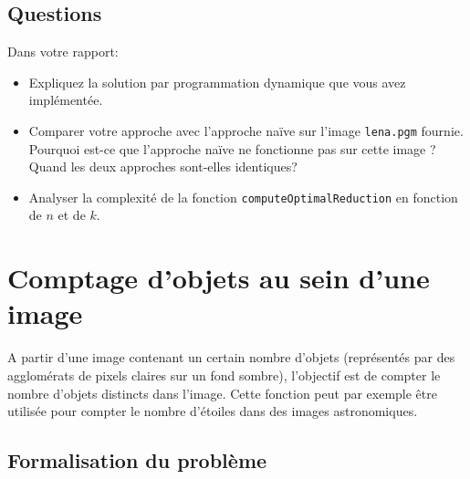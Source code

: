 \documentclass[a4paper,10pt]{article}
\begin{document}
\subsection*{Questions}

Dans votre rapport:
\begin{itemize}
\item Expliquez la solution par programmation dynamique que vous avez implémentée.
\item Comparer votre approche avec l'approche naïve sur l'image \texttt{lena.pgm} fournie. Pourquoi est-ce que l'approche naïve ne fonctionne pas sur cette image ? Quand les deux approches sont-elles identiques?
\item Analyser la complexité de la fonction \texttt{computeOptimalReduction} en fonction de $n$ et de $k$.
\end{itemize}

\section{Comptage d'objets au sein d'une image}

A partir d'une image contenant un certain nombre d'objets (représentés par des agglomérats de pixels claires sur un fond sombre), l'objectif est de compter le nombre d'objets
distincts dans l'image. Cette fonction peut par exemple être utilisée
pour compter le nombre d'étoiles dans des images astronomiques.

\subsection*{Formalisation du problème}
\end{document}
